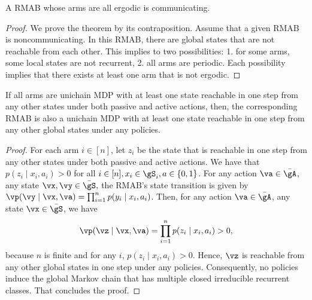 \begin{thm}
    \label{thm:aperiodic_RB_comm} A RMAB whose arms are all ergodic is communicating. 
\end{thm}
\begin{proof}
    We prove the theorem by its contraposition. Assume that a given RMAB is noncommunicating.
    In this RMAB, there are global states that are not reachable from each other.
    This implies to two possibilities: 1. for some arms, some local states are not recurrent, 2. all arms are periodic.
    Each possibility implies that there exists at least one arm that is not ergodic.
\end{proof}

\begin{thm}
    \label{thm:unichain} If all arms are unichain MDP with at least one state reachable in one step from any other states under both passive and active actions, then, the corresponding RMAB is also a unichain MDP with at least one state reachable in one step from any other global states under any policies.
\end{thm}
\begin{proof}
    For each arm $i\in[n]$, let $z_i$ be the state that is reachable in one step from any other states under both passive and active actions.
    We have that $p(z_i \mid x_i, a_i)>0$ for all $i\in[n], x_i\in\gS_i,a\in\{0,1\}$.
    For any action $\va\in\bar{\gA}$, any state $\vx,\vy\in\bar{\gS},$ the RMAB's state transition is given by ${\vp(\vy \mid \vx, \va) =\prod_{i=1}^n p(y_i \mid x_i, a_i)}$.
    Then, for any action $\va\in\bar{\gA}$, any state $\vx\in\bar{\gS}$, we have
    \begin{align*}
        \vp(\vz \mid \vx, \va) =\prod_{i=1}^n p(z_i \mid x_i,a_i) > 0,
    \end{align*}
    because $n$ is finite and for any $i$, $p(z_i \mid x_i, a_i)>0$.
    Hence, $\vz$ is reachable from any other global states in one step under any policies.
    Consequently, no policies induce the global Markov chain that has multiple closed irreducible recurrent classes.
    That concludes the proof.
\end{proof}

